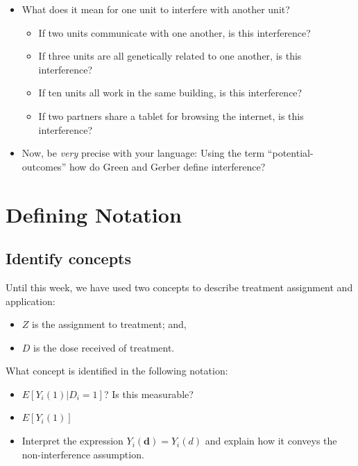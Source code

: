 \documentclass[
]{book}
\providecommand{\tightlist}{%
  \setlength{\itemsep}{0pt}\setlength{\parskip}{0pt}}
\begin{document}
\begin{itemize}
\tightlist
\item
  What does it mean for one unit to interfere with another unit?

  \begin{itemize}
  \tightlist
  \item
    If two units communicate with one another, is this interference?
  \item
    If three units are all genetically related to one another, is this
    interference?
  \item
    If ten units all work in the same building, is this interference?
  \item
    If two partners share a tablet for browsing the internet, is this
    interference?
  \end{itemize}
\item
  Now, be \emph{very} precise with your language: Using the term
  ``potential-outcomes'' how do Green and Gerber define interference?
\end{itemize}

\hypertarget{defining-notation}{%
\section{Defining Notation}\label{defining-notation}}

\hypertarget{identify-concepts}{%
\subsection{Identify concepts}\label{identify-concepts}}

Until this week, we have used two concepts to describe treatment
assignment and application:

\begin{itemize}
\tightlist
\item
  \(Z\) is the assignment to treatment; and,
\item
  \(D\) is the dose received of treatment.
\end{itemize}

What concept is identified in the following notation:

\begin{itemize}
\tightlist
\item
  \(E[Y_{i}(1) | D_{i} = 1]\)? Is this measurable?
\item
  \(E[Y_{i}(1)]\)
\item
  Interpret the expression \(Y_{i}(\mathbf{d}) = Y_{i}(d)\) and explain
  how it conveys the non-interference assumption.
\end{itemize}
\end{document}
